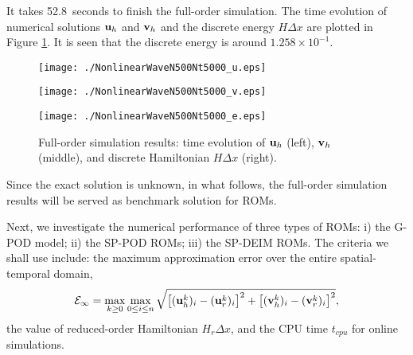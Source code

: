 \documentclass[11pt]{article}
\begin{document}
It takes 52.8~seconds to finish the full-order simulation. The time evolution of numerical solutions ${\bf u}_h$ and ${\bf v}_h$ and the discrete energy $H\Delta x$ are plotted in Figure \ref{Fig: lin_wave_full}.
It is seen that the discrete energy is around $1.258\times 10^{-1}$.  
\begin{figure}[htb]
\centering
\begin{minipage}[ht]{0.31\linewidth}
\texttt{[image: ./NonlinearWaveN500Nt5000\_u.eps]}
\end{minipage}
\begin{minipage}[ht]{0.31\linewidth}
\texttt{[image: ./NonlinearWaveN500Nt5000\_v.eps]}
\end{minipage}
\begin{minipage}[ht]{0.36\linewidth}
\vspace{1cm}
\texttt{[image: ./NonlinearWaveN500Nt5000\_e.eps]}
\end{minipage}
\caption{
Full-order simulation results: time evolution of ${\bf u}_h$ (left), ${\bf v}_h$ (middle), and discrete Hamiltonian $H\Delta x$ (right).
}\label{Fig: lin_wave_full}
\end{figure}
Since the exact solution is unknown, in what follows, the full-order simulation results will be served as benchmark solution for ROMs.


Next, we investigate the numerical performance of three types of ROMs: i) the G-POD model; ii) the SP-POD ROMs; iii) the SP-DEIM ROMs.
The criteria we shall use include: the maximum approximation error over the entire spatial-temporal domain,
$$\mathcal{E}_\infty= \max\limits_{k\geq 0} \max\limits_{0\leq i\leq n}  \sqrt{\left[({\bf u}_h^k)_i-({\bf u}_r^k)_i\right]^2+\left[({\bf v}_h^k)_i-({\bf v}_r^k)_i\right]^2},$$
the value of reduced-order Hamiltonian $H_r\Delta x$, 
and the CPU time $t_{cpu}$ for online simulations.
\end{document}
